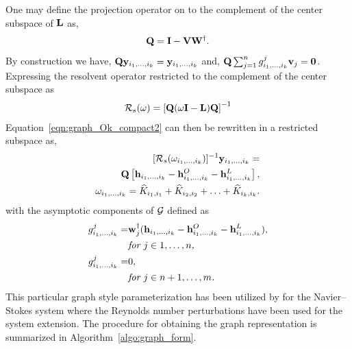 One may define the projection operator on to the complement of the center subspace of $\mathbf{L}$ as, 
\begin{align}
	\label{eqn:complement_projector}
	\mathbf{Q} = \mathbf{I} - \mathbf{V}\mathbf{W}^{\dagger}.
\end{align}
By construction we have, $\mathbf{Q}\mathbf{y}_{i_{1},\ldots,i_{k}} = \mathbf{y}_{i_{1},\ldots,i_{k}}$ and, $\mathbf{Q}\sum^{n}_{j=1}g^{j}_{i_{1},\ldots,i_{k}}\mathbf{v}_{j} = \mathbf{0}$. Expressing the resolvent operator restricted to the complement of the center subspace as 
\begin{align}
	\mathcal{R}_{s}(\omega) = \left[\mathbf{Q}(\omega\mathbf{I} - \mathbf{L})\mathbf{Q}\right]^{-1}
\end{align}
Equation~\eqref{eqn:graph_Ok_compact2} can then be rewritten in a restricted subspace as,
\begin{subequations}
\label{eqn:graph_Ok_compact3}
\begin{align}
	\begin{aligned}
		\RestrictedResolvent{\omega_{i_{1},\ldots,i_{k}}}^{-1}\AsCenM_{i_{1},\ldots,i_{k}} = \\
		\mathbf{Q}\left[\AsForcing_{i_{1},\ldots,i_{k}} - \AsForcingO_{i_{1},\ldots,i_{k}} 
		- \AsForcingL_{i_{1},\ldots,i_{k}}\right],
	\end{aligned} \\
	\omega_{i_{1},\ldots,i_{k}} = \widehat{K}_{i_{1},i_{1}} + \widehat{K}_{i_{2},i_{2}} + \ldots + \widehat{K}_{i_{k},i_{k}}.
\end{align}
\end{subequations}
with the asymptotic components of $\mathcal{G}$ defined as
\begin{subequations}
	\label{eqn:graph_gk_definition3}
	\begin{align}
		g^{j}_{i_{1},\ldots,i_{k}} 
		=& \mathbf{w}^{\dagger}_{j}(\mathbf{h}_{i_{1},\ldots,i_{k}} - \mathbf{h}^{O}_{i_{1},\ldots,i_{k}} 
		- \mathbf{h}^{L}_{i_{1},\ldots,i_{k}}), \\
		&\textit{for $j\in 1,\ldots,n$,} \nonumber \\
	 	g^{j}_{i_{1},\ldots,i_{k}} 
	 	=& 0, \\
	 	&\textit{\textit{for} $j\in n+1,\ldots,m$.} \nonumber
	 \end{align}
\end{subequations}
 This particular graph style parameterization has been utilized by \citet{negi24} for the Navier--Stokes system where the Reynolds number perturbations have been used for the system extension. The procedure for obtaining the graph representation is summarized in  Algorithm~\ref{algo:graph_form}. 
